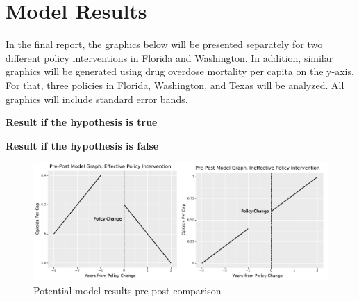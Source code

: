 \documentclass[12pt]{article}
\begin{document}
\vspace*{0.5cm}




\section{Model Results}

In the final report, the graphics below will be presented separately for two different policy interventions in Florida and Washington. In addition, similar graphics will be generated using drug overdose mortality per capita on the y-axis. For that, three policies in Florida, Washington, and Texas will be analyzed. All graphics will include standard error bands.


\begin{minipage}{0.5\textwidth}
\centering
\textbf{Result if the hypothesis is true}
\end{minipage}
\begin{minipage}{0.5\textwidth}
\centering
\textbf{Result if the hypothesis is false}
\end{minipage}

\begin{figure}[H]
    \centering
    \includegraphics[scale=.5]{41_project_strategy_potential_model_results_prepost.png}
    \caption{Potential model results pre-post comparison }
    \label{fig:prepost}
\end{figure}
\end{document}
